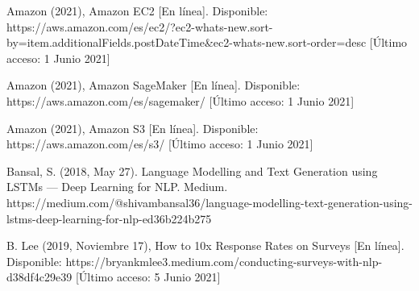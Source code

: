 \documentclass[12pt, a4paper, titlepage]{report}
\begin{document}
\begin{thebibliography}{20}
	Amazon (2021), Amazon EC2 [En línea]. Disponible: https://aws.amazon.com/es/ec2/?ec2-whats-new.sort-by=item.additionalFields.postDateTime\&ec2-whats-new.sort-order=desc [Último acceso: 1 Junio 2021]
	
	Amazon (2021), Amazon SageMaker [En línea]. Disponible: https://aws.amazon.com/es/sagemaker/ [Último acceso: 1 Junio 2021]
	
	Amazon (2021), Amazon S3 [En línea]. Disponible: https://aws.amazon.com/es/s3/ [Último acceso: 1 Junio 2021]
	
	Bansal, S. (2018, May 27). Language Modelling and Text Generation using LSTMs — Deep Learning for NLP. Medium. https://medium.com/@shivambansal36/language-modelling-text-generation-using-lstms-deep-learning-for-nlp-ed36b224b275
	
	B. Lee (2019, Noviembre 17), How to 10x Response Rates on Surveys [En línea]. Disponible: https://bryankmlee3.medium.com/conducting-surveys-with-nlp-d38df4c29e39 [Último acceso: 5 Junio 2021]
	
\end{thebibliography}	
\end{document}

